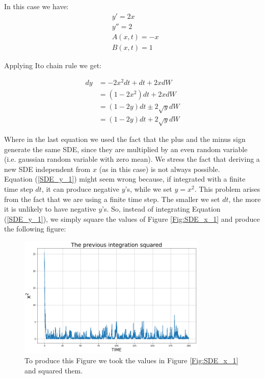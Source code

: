 In this case we have:
 \begin{equation}
     \begin{split}
         & y' = 2x \\
         & y'' = 2 \\
         & A(x, t) = -x \\
         & B(x, t) = 1
     \end{split}
 \end{equation}

Applying Ito chain rule we get: 
  
\begin{align}
        \nonumber dy &= -2x^2dt + dt + 2xdW \\
        \nonumber &= (1-2x^2)dt + 2xdW\\
        \nonumber &= (1-2y)dt \pm 2\sqrt{y}dW\\
                  &= (1-2y)dt + 2\sqrt{y}dW
    \end{align}
\label{SDE_y_1}

Where in the last equation we used the fact that the plus and the minus sign generate the same SDE, since they are multiplied by an even random variable (i.e. gaussian random variable with zero mean).
We stress the fact that deriving a new SDE independent from $x$ (as in this case) is not always possible. \\
Equation (\ref{SDE_y_1}) might seem wrong because, if integrated with a finite time step $dt$, it can produce negative $y$'s, while we set $y = x^2$. This problem arises from the fact that we are using a finite time step. The smaller we set $dt$, the more it is unlikely to have negative $y$'s. So, instead of integrating Equation (\ref{SDE_y_1}), we simply square the values of Figure \ref{Fig:SDE_x_1} and produce the following figure: 
\begin{figure}[H]
  \centering
  \includegraphics[width=0.8\textwidth]{SDE/Figures/SDEy.png}
  \caption{To produce this Figure we took the values in Figure \ref{Fig:SDE_x_1} and squared them.}
  \label{Fig:SDE_y}
\end{figure}

